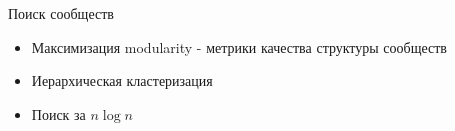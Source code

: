 \documentclass[10pt]{beamer}
\begin{document}
\begin{frame}{Поиск сообществ}

\begin{itemize}
\item Максимизация modularity - метрики качества структуры сообществ
\item Иерархическая кластеризация
\item Поиск за $n\log n$
\end{itemize}

\end{frame}
\end{document}
